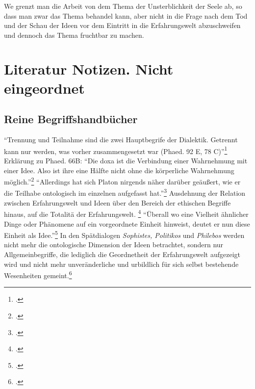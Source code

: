 \documentclass[12pt]{article}
\begin{document}
We grenzt man die Arbeit von dem Thema der Unsterblichkeit der Seele ab, so dass man zwar das Thema behandel kann, aber nicht in die Frage nach dem Tod und der Schau der Ideen vor dem Eintritt in die Erfahrungswelt abzuschweifen und dennoch das Thema fruchtbar zu machen.

\section*{Literatur Notizen. Nicht eingeordnet}
\subsection*{Reine Begriffshandbücher}
\enquote{Trennung und Teilnahme sind die zwei Hauptbegrife der Dialektik. Getrennt kann nur werden, was vorher zusammengesetzt war (Phaed. 92 E, 78 C)}\footcite[][S. 349]{Perls}
Erklärung zu Phaed. 66B: \enquote{Die doxa ist die Verbindung einer Wahrnehmung mit einer Idee. Also ist ihre eine Hälfte nicht ohne die körperliche Wahrnehmung möglich.}\footcite[][S. 350]{Perls}
\enquote{Allerdings hat sich Platon nirgends näher darüber geäußert, wie er die Teilhabe ontologisch im einzelnen aufgefasst hat.}\footcite[][S. 172]{Gigon75}
Ausdehnung der Relation zwischen Erfahrungswelt und Ideen über den Bereich der ethischen Begriffe hinaus, auf die Totalitä der Erfahrungswelt. \footcite[vgl.][S. 172]{Gigon75} \enquote{Überall wo eine Vielheit ähnlicher Dinge oder Phänomene auf ein vorgeordnete Einheit hinweist, deutet er nun diese Einheit als Idee.}\footcite[][S. 172]{Gigon75}
In den Spätdialogen \emph{Sophistes, Politikos} und \emph{Philebos} werden nicht mehr die ontologische Dimension der Ideen betrachtet, sondern nur Allgemeinbegriffe, die lediglich die Geordnetheit der Erfahrungswelt aufgezeigt wird und nicht mehr unveränderliche und urbildlich für sich selbst bestehende Wesenheiten gemeint.\footcite[vgl.][S. 174]{Gigon75}
\end{document}

